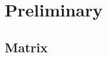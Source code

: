 \chapter{Preliminary}

\section{Matrix}

\begin{definition}
\end{definition}

\begin{definition}
\end{definition}

\begin{definition}
\end{definition}

\begin{definition}
\end{definition}

